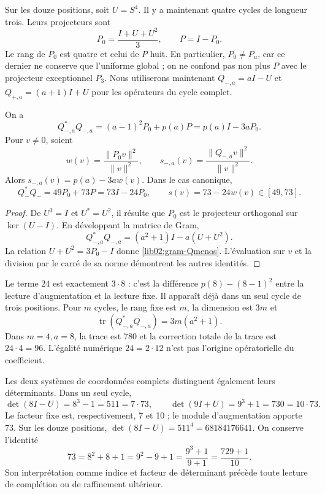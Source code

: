 Sur les douze positions, soit \(U=S^4\). Il y a maintenant quatre cycles de
longueur trois. Leurs projecteurs sont
\[
 P_0=\frac{I+U+U^2}{3},\qquad P=I-P_0.
\]
Le rang de \(P_0\) est quatre et celui de \(P\) huit. En particulier,
\(P_0\ne P_u\), car ce dernier ne conserve que l’uniforme global ;
on ne confond pas non plus \(P\) avec le projecteur exceptionnel \(P_3\).
Nous utiliserons maintenant \(Q_{-,a}=aI-U\) et \(Q_{+,a}=(a+1)I+U\)
pour les opérateurs du cycle complet.

\begin{theorem}
\label{lib02:gram-ternario}
On a
\begin{equation}
 Q_{-,a}^*Q_{-,a}
 =(a-1)^2P_0+p(a)P=p(a)I-3aP_0.
 \label{lib02:gram-Qmenos}
\end{equation}
Pour \(v\ne0\), soient
\[
 w(v)=\frac{\|P_0v\|^2}{\|v\|^2},\qquad
 s_{-,a}(v)=\frac{\|Q_{-,a}v\|^2}{\|v\|^2}.
\]
Alors \(s_{-,a}(v)=p(a)-3aw(v)\). Dans le cas canonique,
\begin{equation}
 Q_-^*Q_-=49P_0+73P=73I-24P_0,
 \qquad s(v)=73-24w(v)\in[49,73].
 \label{lib02:73-24w}
\end{equation}
\end{theorem}
\begin{proof}
De \(U^3=I\) et \(U^*=U^2\), il résulte que \(P_0\) est le projecteur orthogonal sur \(\ker(U-I)\). En développant la matrice de Gram,
\[
 Q_{-,a}^*Q_{-,a}=(a^2+1)I-a(U+U^2).
\]
La relation \(U+U^2=3P_0-I\) donne \eqref{lib02:gram-Qmenos}. L'évaluation sur \(v\) et la division par le carré de sa norme démontrent les autres identités.
\end{proof}

Le terme \(24\) est exactement \(3\cdot8\) : c’est la différence
\(p(8)-(8-1)^2\) entre la lecture d’augmentation et la lecture fixe. Il apparaît déjà
dans un seul cycle de trois positions. Pour \(m\) cycles, le rang fixe
est \(m\), la dimension est \(3m\) et
\[
 \operatorname{tr}(Q_{-,a}^*Q_{-,a})=3m(a^2+1).
\]
Dans \(m=4,a=8\), la trace est 780 et la correction totale de la trace
est \(24\cdot4=96\). L’égalité numérique \(24=2\cdot12\) n’est pas
l’origine opératorielle du coefficient.

Les deux systèmes de coordonnées complets distinguent également leurs déterminants. Dans un
seul cycle,
\[
 \det(8I-U)=8^3-1=511=7\cdot73,
 \qquad
 \det(9I+U)=9^3+1=730=10\cdot73.
\]
Le facteur fixe est, respectivement, 7 et 10 ; le module d'augmentation apporte 73. Sur les douze positions, \(\det(8I-U)=511^4=68184176641\). On conserve l'identité
\begin{equation}
 73=8^2+8+1=9^2-9+1=\frac{9^3+1}{9+1}
 =\frac{729+1}{10}.
 \label{lib02:completacion73}
\end{equation}
Son interprétation comme indice et facteur de déterminant précède
toute lecture de complétion ou de raffinement ultérieur.

